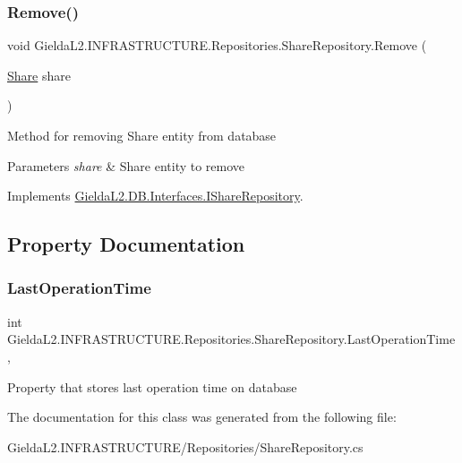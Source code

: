 \subsubsection{\texorpdfstring{Remove()}{Remove()}}
{\footnotesize\ttfamily void Gielda\+L2.\+I\+N\+F\+R\+A\+S\+T\+R\+U\+C\+T\+U\+R\+E.\+Repositories.\+Share\+Repository.\+Remove (\begin{DoxyParamCaption}\item[{\mbox{\hyperlink{class_gielda_l2_1_1_d_b_1_1_entities_1_1_share}{Share}}}]{share }\end{DoxyParamCaption})}



Method for removing Share entity from database 


\begin{DoxyParams}{Parameters}
{\em share} & Share entity to remove\\
\hline
\end{DoxyParams}


Implements \mbox{\hyperlink{interface_gielda_l2_1_1_d_b_1_1_interfaces_1_1_i_share_repository_a270dc411526d961bac26e1df19ae2563}{Gielda\+L2.\+D\+B.\+Interfaces.\+I\+Share\+Repository}}.



\subsection{Property Documentation}
\mbox{\label{class_gielda_l2_1_1_i_n_f_r_a_s_t_r_u_c_t_u_r_e_1_1_repositories_1_1_share_repository_ad778ea8d672a171a35af26957efe3c88}} 
\subsubsection{\texorpdfstring{LastOperationTime}{LastOperationTime}}
{\footnotesize\ttfamily int Gielda\+L2.\+I\+N\+F\+R\+A\+S\+T\+R\+U\+C\+T\+U\+R\+E.\+Repositories.\+Share\+Repository.\+Last\+Operation\+Time\hspace{0.3cm}{\ttfamily [get]}, {\ttfamily [set]}}



Property that stores last operation time on database 



The documentation for this class was generated from the following file\+:\begin{DoxyCompactItemize}
\item 
Gielda\+L2.\+I\+N\+F\+R\+A\+S\+T\+R\+U\+C\+T\+U\+R\+E/\+Repositories/Share\+Repository.\+cs\end{DoxyCompactItemize}
